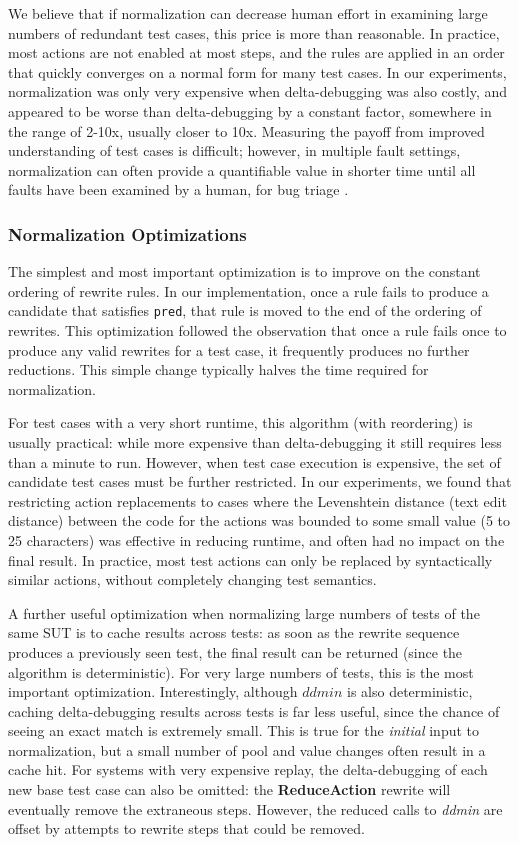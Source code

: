 We believe that if normalization can decrease human effort in
examining large numbers of redundant test cases, this price is more
than reasonable.  In practice, most actions are not enabled at most
steps, and the rules are applied in an order that quickly converges on
a normal form for many test cases.  In our experiments, normalization
was only very expensive when delta-debugging was also costly, and
appeared to be worse than delta-debugging by a constant factor,
somewhere in the range of 2-10x, usually closer to 10x.  Measuring the
payoff from improved understanding of test cases is difficult;
however, in multiple fault settings, normalization can often
provide a quantifiable value in shorter time until all faults have
been examined by a human, for bug triage \cite{PLDI13}.

\subsubsection{Normalization Optimizations}

The simplest and most important optimization is to improve on the
constant ordering of rewrite rules.  In our implementation, once a
rule fails to produce a candidate that satisfies {\tt pred}, that rule
is moved to the end of the ordering of rewrites.  This optimization
followed the observation that once a rule fails once to produce any
valid rewrites for a test case, it frequently produces no further
reductions.  This simple change typically halves the time required for
normalization.

For test cases with a very short runtime, this algorithm (with
reordering) is usually practical: while more expensive than delta-debugging
it still requires  less than a minute to run.  However, when test case
execution is expensive, the set of candidate test cases must be
further restricted.  In our experiments, we found that restricting
action replacements to cases where the Levenshtein \cite{Lev} distance
(text edit distance) between the code for the actions was bounded to
some small value (5 to 25 characters) was effective in reducing runtime, and often had no
impact on the final result.  In practice, most test actions can only
be replaced by syntactically similar actions, without completely
changing test semantics.

A further useful optimization when normalizing large numbers of tests
of the same SUT is to cache results across tests: as soon as the rewrite
sequence produces a previously seen test, the final result can be
returned (since the algorithm is deterministic).   For very large
numbers of tests, this is the most important optimization.
Interestingly, although $ddmin$ is also deterministic, caching
delta-debugging results across tests is far less useful, since the chance of seeing
an exact match is extremely small.  This is true for the \emph{initial} input to
normalization, but a small number of pool and value changes often result in a
cache hit. For systems with
very expensive replay, the delta-debugging of each new base test case
can also be omitted: the {\bf ReduceAction} rewrite will
eventually remove the extraneous steps.  However, the reduced calls to
\emph{ddmin} are offset by attempts to rewrite steps that could be
removed.  

